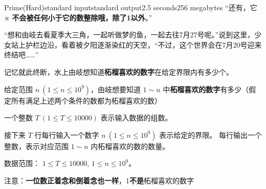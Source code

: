 \documentclass[12pt,a4paper,oneside]{article}
\begin{document}
\begin{problem}{Prime(Hard)}{standard input}{standard output}{2.5 seconds}{256 megabytes}
        “还有，它 ※ \textbf{不会被任何小于它的数整除哦，除了1以外}。”
        
        “想和由岐去看夏季大三角，一起听做梦的鱼，一起去往7月27号呢。”说到这里，少女站上护栏边沿，看着被夕阳逐渐染红的天空，“不过，这个世界会在7月20号迎来终结吧……”
        
        记忆就此终断，水上由岐想知道\textbf{柘榴喜欢的数字}在给定界限内有多少个。


        给定范围 $n\ (1 \le n \le  10^9)$，由岐想要知道 $1 \sim n$ 中\textbf{柘榴喜欢的数字}有多少（假定所有满足上述两个条件的数都为柘榴喜欢的数）


		
		\InputFile
		
		
        一个整数 $T\ (1\leq T \leq 10000)$ 表示输入数据的组数。
        
        接下来 $T$ 行每行输入一个数字 $n \ (1 \leq n \leq   10^9)$ 表示给定的界限。
		\OutputFile
		每行输出一个整数，表示对应范围 $1 \sim n$ 内柘榴喜欢的数的数量。
		
		\Example
		
		\begin{example}
		\end{example}

        \Note
        
        数据范围： $1\leq T \leq 10000$, $1 \leq n \leq  10^9$。
        
        注意：\textbf{一位数正着念和倒着念也一样}，1\textbf{不是}柘榴喜欢的数字
	\end{problem}
	


\end{document}
